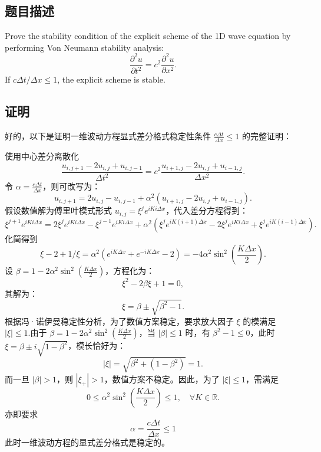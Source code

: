 \subsection{题目描述}
\noindent
Prove the stability condition of the explicit scheme of the 1D wave equation by performing Von Neumann stability analysis:
\[
    \frac{\partial^2 u}{\partial t^2} = c^2 \frac{\partial^2 u}{\partial x^2}.
\]
If \(c \Delta t / \Delta x \leq 1\), the explicit scheme is stable.

\subsection{证明}
好的，以下是证明一维波动方程显式差分格式稳定性条件 \( \frac{c \Delta t}{\Delta x} \leq 1 \) 的完整证明：

使用中心差分离散化
\[
    \frac{u_{i,j+1} - 2u_{i,j} + u_{i,j-1}}{\Delta t^2} = c^2 \frac{u_{i+1,j} - 2u_{i,j} + u_{i-1,j}}{\Delta x^2}.
\]
令 \( \alpha = \frac{c \Delta t}{\Delta x} \)，则可改写为：
\[
    u_{i,j+1} = 2u_{i,j} - u_{i,j-1} + \alpha^2 (u_{i+1,j} - 2u_{i,j} + u_{i-1,j}).
\]
假设数值解为傅里叶模式形式 \( u_{i,j} = \xi^j e^{iK i \Delta x} \)，代入差分方程得到：
\[
    \xi^{j+1} e^{iK i \Delta x} = 2\xi^j e^{iK i \Delta x} - \xi^{j-1} e^{iK i \Delta x} + \alpha^2 \left( \xi^j e^{iK (i+1) \Delta x} - 2\xi^j e^{iK i \Delta x} + \xi^j e^{iK (i-1) \Delta x} \right).
\]
化简得到
\[
    \xi - 2 + 1/\xi = \alpha^2 (e^{iK \Delta x} + e^{-iK \Delta x} - 2) = -4\alpha^2 \sin^2\left(\frac{K \Delta x}{2}\right).
\]
设 \( \beta = 1 - 2\alpha^2 \sin^2\left(\frac{K \Delta x}{2}\right) \)，方程化为：
\[
    \xi^2 - 2\beta \xi + 1 = 0,
\]
其解为：
\[
    \xi = \beta \pm \sqrt{\beta^2 - 1}.
\]
根据冯·诺伊曼稳定性分析，为了数值方案稳定，要求放大因子 \( \xi \) 的模满足 \( |\xi| \leq 1 \).由于 \( \beta = 1 - 2\alpha^2 \sin^2\left(\frac{K \Delta x}{2}\right) \)，当 \( |\beta| \leq 1 \) 时，有 \( \beta^2 - 1 \leq 0 \)，此时 \( \xi = \beta \pm i\sqrt{1 - \beta^2} \)，模长恰好为：
\[
    |\xi| = \sqrt{\beta^2 + (1 - \beta^2)} = 1.
\]
而一旦 \( |\beta| > 1 \)，则 \( |\xi_{+}| > 1 \)，数值方案不稳定。因此，为了 \( |\xi| \leq 1 \)，需满足
\[
    0\leq\alpha^2\sin^2(\frac{K\Delta x}2)\leq1, \quad \forall K \in \mathbb{R}.
\]
亦即要求
\[
    \boxed{\alpha = \frac{c \Delta t}{\Delta x} \leq 1}
\]
此时一维波动方程的显式差分格式是稳定的。